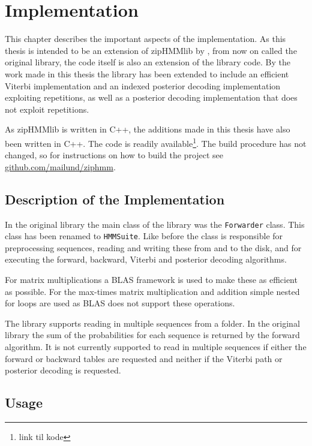 
\chapter{Implementation}
\label{cha:implementation}

This chapter describes the important aspects of the implementation.  As this
thesis is intended to be an extension of zipHMMlib by
\citet{sand2013ziphmmlib}, from now on called the original library, the code
itself is also an extension of the library code.  By the work made in this thesis
the library has been extended to include an efficient Viterbi implementation
and an indexed posterior decoding implementation exploiting repetitions, as well
as a posterior decoding implementation that does not exploit repetitions.

As zipHMMlib is written in C++, the additions made in this thesis have also
been written in C++. The code is readily available\footnote{link til kode}.
 The build procedure has not changed, so for instructions on
how to build the project see \url{github.com/mailund/ziphmm}.

\section{Description of the Implementation}

In the original library the main class of the library was the
\texttt{Forwarder} class.  This class has been renamed to \texttt{HMMSuite}.
Like before the class is responsible for preprocessing sequences, reading and
writing these from and to the disk, and for executing the forward, backward,
Viterbi and posterior decoding algorithms.

For matrix multiplications a BLAS framework is used to make these as efficient
as possible.  For the max-times matrix multiplication and addition simple nested
for loops are used as BLAS does not support these operations.

The library supports reading in multiple sequences from a folder. In the
original library the sum of the probabilities for each sequence is returned by
the forward algorithm. It is not currently supported to read in multiple
sequences if either the forward or backward tables are requested and neither if
the Viterbi path or posterior decoding is requested.

\section{Usage}

